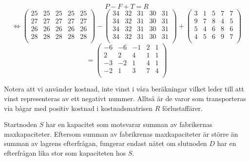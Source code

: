 \documentclass[titlepage, a4paper]{article}
\begin{document}
\begin{displaymath}
P - F + T = R
\end{displaymath}
\begin{displaymath}
\Leftrightarrow
\begin{pmatrix}
     {25} & {25} & {25} & {25} & {25} \\
     {27} & {27} & {27} & {27} & {27} \\
     {26} & {26} & {26} & {26} & {26} \\
     {28} & {28} & {28} & {28} & {28} \\
\end{pmatrix}
-
\begin{pmatrix}
    {34} & {32} & {31} & {30} & {31} \\
    {34} & {32} & {31} & {30} & {31} \\
    {34} & {32} & {31} & {30} & {31} \\
    {34} & {32} & {31} & {30} & {31} \\
\end{pmatrix}
+
\begin{pmatrix}
    {3} & {1} & {5} & {7} & {7} \\
    {9} & {7} & {8} & {4} & {5} \\
    {5} & {4} & {6} & {8} & {6} \\
    {4} & {5} & {6} & {9} & {7} \\
\end{pmatrix}
\end{displaymath}
\begin{displaymath}
=
\begin{pmatrix}
    {-6} & {-6} & {-1} & {2} & {1} \\
    {2} & {2} & {4} & {1} & {1} \\
    {-3} & {-2} & {1} & {4} & {1} \\
    {-2} & {1} & {3} & {7} & {4} \\
\end{pmatrix}
\end{displaymath}

Notera att vi använder kostnad, inte vinst i våra beräkningar vilket leder till att vinst representeras av ett negativt nummer. Alltså är de varor som transporteras via bågar med positiv kostnad i kostnadsmatrisen $R$ förlustaffärer.

Startnoden $S$ har en kapacitet som motsvarar summan av fabrikernas maxkapaciteter. Eftersom summan av fabrikrenas maxkapaciteter är större än summan av lagrens efterfrågan, fungerar endast nätet om slutnoden $D$ har en efterfrågan lika stor som kapaciteten hos $S$.
\end{document}
